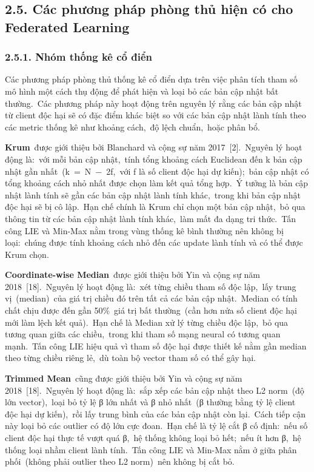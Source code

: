 \subsection{2.5. Các phương pháp phòng thủ hiện có cho Federated Learning}\label{cuxe1c-phux1b0ux1a1ng-phuxe1p-phuxf2ng-thux1ee7-hiux1ec7n-cuxf3-cho-federated-learning}

\subsubsection{2.5.1. Nhóm thống kê cổ điển}\label{nhuxf3m-thux1ed1ng-kuxea-cux1ed5-ux111iux1ec3n}

Các phương pháp phòng thủ thống kê cổ điển dựa trên việc phân tích tham số mô hình một cách thụ động để phát hiện và loại bỏ các bản cập nhật bất thường.~Các phương pháp này hoạt động trên nguyên lý rằng các bản cập nhật từ client độc hại sẽ có đặc điểm khác biệt so với các bản cập nhật lành tính theo các metric thống kê như khoảng cách,~độ lệch chuẩn,~hoặc phân bổ.

\textbf{Krum}~được giới thiệu bởi Blanchard và cộng sự năm 2017~{[}2{]}.~Nguyên lý hoạt động là:~với mỗi bản cập nhật,~tính tổng khoảng cách Euclidean đến k bản cập nhật gần nhất~(k~=~N~−~2f,~với f là số client độc hại dự kiến);~bản cập nhật có tổng khoảng cách nhỏ nhất được chọn làm kết quả tổng hợp.~Ý tưởng là bản cập nhật lành tính sẽ gần các bản cập nhật lành tính khác,~trong khi bản cập nhật độc hại sẽ bị cô lập.~Hạn chế chính là Krum chỉ chọn một bản cập nhật,~bỏ qua thông tin từ các bản cập nhật lành tính khác,~làm mất đa dạng tri thức.~Tấn công LIE và Min-Max nằm trong vùng thống kê bình thường nên không bị loại:~chúng được tính khoảng cách nhỏ đến các update lành tính và có thể được Krum chọn.

\textbf{Coordinate-wise Median}~được giới thiệu bởi Yin và cộng sự năm 2018~{[}18{]}.~Nguyên lý hoạt động là:~xét từng chiều tham số độc lập,~lấy trung vị~(median)~của giá trị chiều đó trên tất cả các bản cập nhật.~Median có tính chất chịu được đến gần 50\%~giá trị bất thường~(cần hơn nửa số client độc hại mới làm lệch kết quả).~Hạn chế là Median xử lý từng chiều độc lập,~bỏ qua tương quan giữa các chiều,~trong khi tham số mạng neural có tương quan mạnh.~Tấn công LIE hiệu quả vì tham số độc hại được thiết kế nằm gần median theo từng chiều riêng lẻ,~dù toàn bộ vector tham số có thể gây hại.

\textbf{Trimmed Mean}~cũng được giới thiệu bởi Yin và cộng sự năm 2018~{[}18{]}.~Nguyên lý hoạt động là:~sắp xếp các bản cập nhật theo L2 norm~(độ lớn vector),~loại bỏ tỷ lệ β lớn nhất và β nhỏ nhất~(β thường bằng tỷ lệ client độc hại dự kiến),~rồi lấy trung bình của các bản cập nhật còn lại.~Cách tiếp cận này loại bỏ các outlier có độ lớn cực đoan.~Hạn chế là tỷ lệ cắt β cố định:~nếu số client độc hại thực tế vượt quá β,~hệ thống không loại bỏ hết;~nếu ít hơn β,~hệ thống loại nhầm client lành tính.~Tấn công LIE và Min-Max nằm ở giữa phân phối~(không phải outlier theo L2 norm)~nên không bị cắt bỏ.

